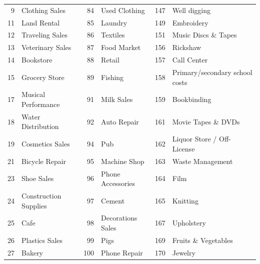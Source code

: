 \begin{longtable}[]{|r|l|r|l|r|l|}
	9           & Clothing Sales        & 84          & Used Clothing             & 147         & Well digging               \\
	11          & Land Rental           & 85          & Laundry                   & 149         & Embroidery                 \\
	12          & Traveling Sales       & 86          & Textiles                  & 151         & Music Discs \& Tapes       \\
	13          & Veterinary Sales      & 87          & Food Market               & 156         & Rickshaw                   \\
	14          & Bookstore             & 88          & Retail                    & 157         & Call Center                \\
	15          & Grocery Store         & 89          & Fishing                   & 158         & Primary/secondary school
	costs                                                                                                                    \\
	17          & Musical Performance   & 91          & Milk Sales                & 159         & Bookbinding                \\
	18          & Water Distribution    & 92          & Auto Repair               & 161         & Movie Tapes \&
	DVDs                                                                                                                     \\
	19          & Cosmetics Sales       & 94          & Pub                       & 162         & Liquor Store / Off-License \\
	21          & Bicycle Repair        & 95          & Machine Shop              & 163         & Waste Management           \\
	23          & Shoe Sales            & 96          & Phone Accessories         & 164         & Film                       \\
	24          & Construction Supplies & 97          & Cement                    & 165         & Knitting                   \\
	25          & Cafe                  & 98          & Decorations Sales         & 167         & Upholstery                 \\
	26          & Plastics Sales        & 99          & Pigs                      & 169         & Fruits \& Vegetables       \\
	27          & Bakery                & 100         & Phone Repair              & 170         & Jewelry                    \\

\end{longtable}
